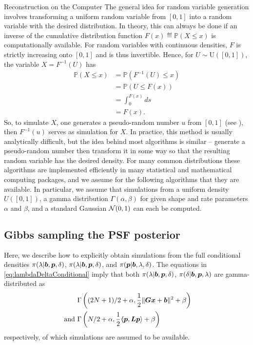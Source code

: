 \begin{chapter}{Reconstruction on the Computer}
The general idea for random variable generation involves transforming a uniform random variable from $[0,1]$ into a random variable with the desired distribution.
In theory, this can always be done if an inverse of the cumulative distribution function $F(x) \eqdef \mathbb P(X \le x)$ is computationally available.
For random variables with continuous densities, $F$ is strictly increasing onto $[0,1]$ and is thus invertible.  
Hence, for $U\sim \mathrm{U([0,1])}$, the variable $X = F^{-1}(U)$ has 
\begin{align}
  \mathbb P( X \le x) 
  &= \mathbb P( F^{-1}(U)\le  x ) \nonumber \\
  &= \mathbb P( U \le F(x) )\nonumber\\
  &= \int_0^{F(x)}ds\nonumber\\
  &= F(x).
\end{align}
So, to simulate $X$, one generates a pseudo-random number $u$ from $[0,1]$ (see \citep{knuthart1981}), then $F^{-1}(u)$ serves as simulation for $X$.
In practice, this method is usually analytically difficult, but the idea behind most algorithms is similar -- generate a pseudo-random number then transform it in some way so that the resulting random variable has the desired density.
For many common distributions these algorithms are implemented efficiently in many statistical and mathematical computing packages, and we assume for the following algorithms that they are available.
In particular, we assume that simulations from a uniform density $U([0,1])$, a gamma distribution $\Gamma(\alpha,\beta)$ for given shape and rate parameters $\alpha$ and $\beta$, and a standard Gaussian $\mathcal{N}(0,1)$ can each be computed.

\subsection{Gibbs sampling the PSF posterior}

Here, we describe how to explicitly obtain simulations from the full conditional densities $\pi(\lambda|\mbox{\boldmath$b$},\mbox{\boldmath$p$},\delta)$, $\pi(\lambda|\mbox{\boldmath$b$},\mbox{\boldmath$p$},\delta)$, and $\pi(\mbox{\boldmath$p$}|\mbox{\boldmath$b$},\lambda,\delta)$.
The equations in \eqref{eq:lambdaDeltaConditional} imply that both $\pi(\lambda|\mbox{\boldmath$b$},\mbox{\boldmath$p$},\delta)$, $\pi(\delta|\mbox{\boldmath$b$},\mbox{\boldmath$p$},\lambda)$ are gamma-distributed as
\begin{align}
  &\Gamma\left((2N+1)/2+\alpha,\frac{1}{2}\|\mbox{\boldmath$Gx$} + \mbox{\boldmath$b$}\|^2 + \beta\right)\nonumber\\
  \text{ and }&\Gamma\left(N/2+\alpha,\frac{1}{2}\mbox{\boldmath$\langle$} \mbox{\boldmath$p$},\mbox{\boldmath$L$}\mbox{\boldmath$p$} \rangle+ \beta\right)
\end{align}
respectively, of which simulations are assumed to be available.


\end{chapter}
